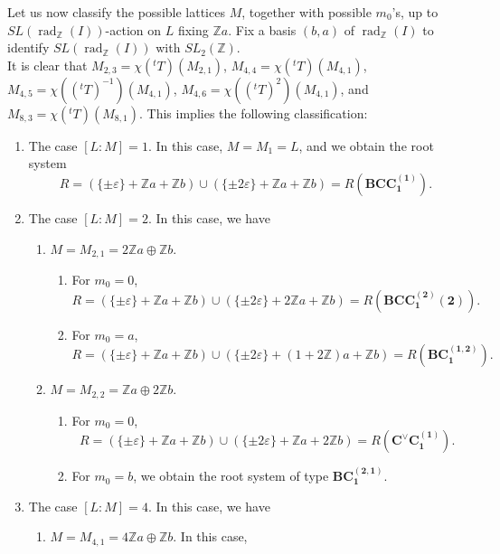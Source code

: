 \documentclass[11pt]{amsart}
\newcommand{\Z}{\mathbb{Z}}
\newcommand{\rad}{\operatorname{rad}}
\newcommand{\vep}{\varepsilon}
\begin{document}
Let us now classify the possible lattices $M$, together with possible $m_0$'s, up to $SL(\rad_{\Z}(I))$-action on $L$ fixing $\Z a$. Fix a basis $(b,a)$ of $\rad_{\Z}(I)$ to identify $SL(\rad_{\Z}(I))$ with $SL_2(\Z)$. \\

It is clear that $M_{2,3}=\chi({}^tT)(M_{2,1})$, $M_{4,4}=\chi({}^tT)(M_{4,1})$, $M_{4,5}=\chi(({}^tT)^{-1})(M_{4,1})$, $M_{4,6}=\chi(({}^tT)^2)(M_{4,1})$, and $M_{8,3}=\chi({}^tT)(M_{8,1})$.  This implies the following classification: 

\begin{enumerate}
\item The case $[L:M]=1$.   In this case, $M=M_1=L$, and 
we obtain the root system 
\[ R=(\{ \pm\vep \}+\Z a+\Z b)\cup (\{ \pm 2\vep \}+\Z a+\Z b)=R(\mathbf{BCC_1^{(1)}}).
\]
\item The case $[L:M]=2$.  In this case, we have
\begin{enumerate}
\item[(I)] $M=M_{2,1}=2\Z a\oplus \Z b$.
\begin{enumerate}
\item[(i)] For $m_0=0$,  
\[ R=(\{ \pm\vep \}+\Z a+\Z b) \cup (\{ \pm 2\vep \}+2\Z a+\Z b) = R(\mathbf{BCC_1^{(2)}(2)}).
\]
\item[(ii)] For $m_0=a$,  
\[ R=(\{ \pm\vep \}+\Z a+\Z b) \cup (\{ \pm 2\vep \}+(1+2\Z) a+\Z b) =R(\mathbf{BC_1^{(1,2)}}).
\]
\end{enumerate}
\item[(II))] $M=M_{2,2}=\Z a \oplus 2\Z b$. 
\begin{enumerate}
\item[(i)] For $m_0=0$,  
\[ R=(\{ \pm\vep \}+\Z a+\Z b) \cup (\{ \pm 2\vep \}+\Z a+2\Z b) =R(\mathbf{C^\vee C_1^{(1)}}).
\]
\item[(ii)] For $m_0=b$,  we obtain the root system of type $\mathbf{BC_1^{(2,1)}}$.
\end{enumerate}
\end{enumerate}
\item The case $[L:M]=4$. In this case, we have
\begin{enumerate}
\item[(I)] $M=M_{4,1}=4\Z a \oplus \Z b$. In this case, 

\end{enumerate}
\end{enumerate}
\end{document}
